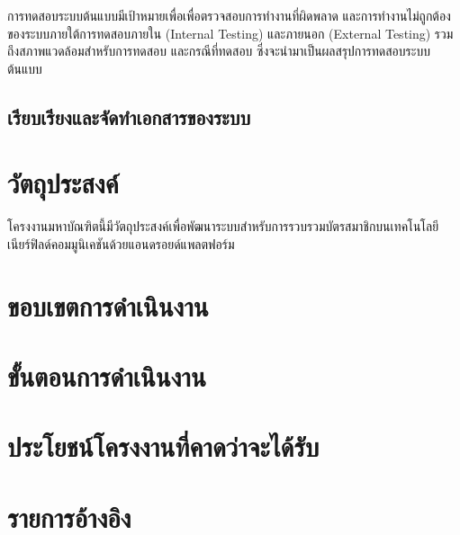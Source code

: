 \documentclass[a4paper]{article}
\begin{document}
การทดสอบระบบต้นแบบมีเป้าหมายเพื่อเพื่อตรวจสอบการทํางานที่ผิดพลาด และการทํางานไม่ถูกต้องของระบบภายใต้การทดสอบภายใน (Internal Testing) และภายนอก (External Testing) รวมถึงสภาพแวดล้อมสําหรับการทดสอบ และกรณีที่ทดสอบ ซึ่งจะนํามาเป็นผลสรุปการทดสอบระบบต้นแบบ

\subsection{เรียบเรียงและจัดทําเอกสารของระบบ}


\section{วัตถุประสงค์}

โครงงานมหาบัณฑิตนี้มีวัตถุประสงค์เพื่อพัฒนาระบบสำหรับการรวบรวมบัตรสมาชิกบนเทคโนโลยีเนียร์ฟิลด์คอมมูนิเคชันด้วยแอนดรอยด์แพลตฟอร์ม

\section{ขอบเขตการดำเนินงาน}

\section{ขั้นตอนการดำเนินงาน}

\section{ประโยชน์โครงงานที่คาดว่าจะได้รับ}

\section{รายการอ้างอิง}
\end{document}
